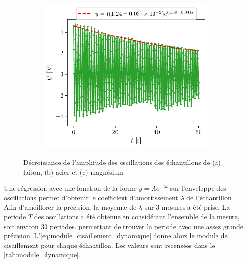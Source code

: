 \begin{figure}[h]
\begin{subfigure}{0.45\linewidth}
        \caption{}
        \label{fig:dynamique_acier}
    \end{subfigure}
    \begin{subfigure}{0.45\linewidth}
        \centering
        \includegraphics[width=\linewidth]{figures/magnesium3.pdf}
        \caption{}
        \label{fig:dynamique_magnesium}
    \end{subfigure}
    \caption{Décroissance de l'amplitude des oscillations des échantillons de (a) laiton, (b) acier et (c) magnésium}
    \label{fig:dynamique}
\end{figure}

Une régression avec une fonction de la forme $y = Ae^{-\lambda t}$ sur l'enveloppe des oscillations permet d'obtenir le coefficient d'amortissement $\lambda$ de l'échantillon. Afin d'ameillorer la précision, la moyenne de $\lambda$ sur 3 mesures a été prise. La periode $T$ des oscillations a été obtenue en considérant l'ensemble de la mesure, soit environ 30 periodes, permettant de trouver la periode avec une assez grande précision. L'\autoref{eq:module_cisaillement_dynamique} donne alors le module de cisaillement pour chaque échantillon. Les valeurs sont recensées dans le \autoref{tab:module_dynamique}.

